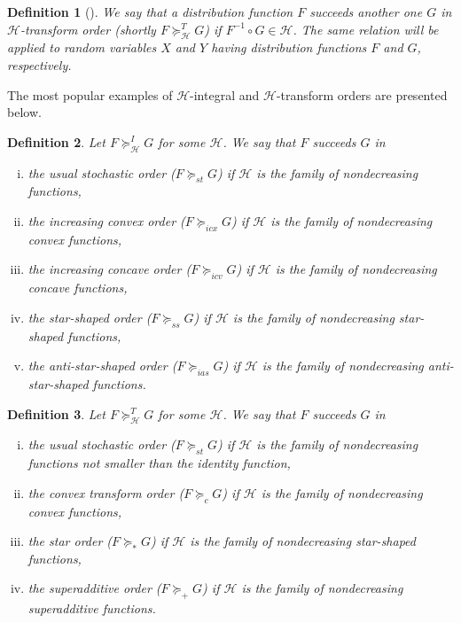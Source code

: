 \documentclass [11pt]{article}
\newtheorem{definition}{Definition}
\begin{document}
\begin{definition}[\cite{marshall2007}]
We say that a distribution function $F$ succeeds another one $G$ in
$\mathcal{H}$-transform order (shortly $F \succeq_{\mathcal{H}} ^T G$) if $F^{-1} \circ G \in \mathcal{H}$. The same relation will be applied to random variables $X$ and $Y$ having distribution functions $F$ and $G$, respectively.
\end{definition}

The most popular examples of $\mathcal{H}$-integral and
$\mathcal{H}$-transform orders are presented below.
\begin{definition}
Let $F \succeq_{\mathcal{H}}^I G$ for some $\mathcal{H}$.
We say that $F$ succeeds $G$ in
\begin{enumerate}[(i)]
\item the usual stochastic order ($F \succeq_{st} G$) if
$\mathcal{H}$ is the family of nondecreasing functions,

\item the increasing convex order ($F \succeq_{icx} G$) if
$\mathcal{H}$ is the family of nondecreasing convex functions,

\item the increasing concave order ($F \succeq_{icv} G$) if
$\mathcal{H}$ is the family of nondecreasing concave functions,

\item the star-shaped order ($F \succeq_{ss} G$) if
$\mathcal{H}$ is the family of nondecreasing star-shaped functions,

\item the anti-star-shaped order ($F \succeq_{ias} G$) if
$\mathcal{H}$ is the family of nondecreasing
anti-star-shaped functions.
\end{enumerate}
\end{definition}


\begin{definition}
Let $F \succeq_{\mathcal{H}}^T G$ for some $\mathcal{H}$.
We say that $F$ succeeds $G$ in
\begin{enumerate}[(i)]
\item the usual stochastic order ($F \succeq_{st} G$) if
$\mathcal{H}$ is the family of nondecreasing functions not smaller than the identity function,

\item the convex transform order ($F \succeq_{c} G$) if
$\mathcal{H}$ is the family of nondecreasing convex functions,

\item the star order ($F \succeq_{*} G$) if
$\mathcal{H}$ is the family of nondecreasing star-shaped functions,

\item the superadditive order ($F \succeq_{+} G$) if
$\mathcal{H}$ is the family of nondecreasing
superadditive functions.
\end{enumerate}
\end{definition}
\end{document}
